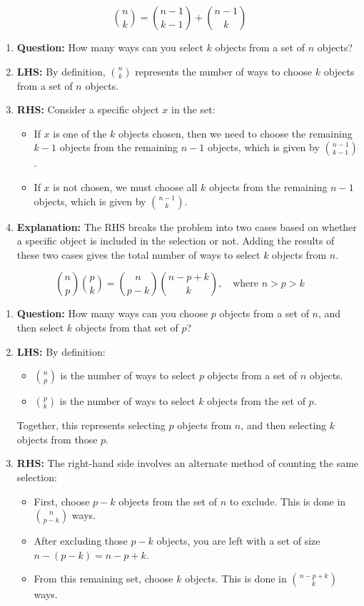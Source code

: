 \begin{example}
    \[
    \binom{n}{k} = \binom{n-1}{k-1} + \binom{n-1}{k}
    \]
    \begin{enumerate}
        \item \textbf{Question:} How many ways can you select $k$ objects from a set of $n$ objects?
        \item \textbf{LHS:} By definition, $\binom{n}{k}$ represents the number of ways to choose $k$ objects from a set of $n$ objects.
        \item \textbf{RHS:} Consider a specific object $x$ in the set:
        \begin{itemize}
            \item If $x$ is one of the $k$ objects chosen, then we need to choose the remaining $k-1$ objects from the remaining $n-1$ objects, which is given by $\binom{n-1}{k-1}$.
            \item If $x$ is not chosen, we must choose all $k$ objects from the remaining $n-1$ objects, which is given by $\binom{n-1}{k}$.
        \end{itemize}
        \item \textbf{Explanation:} The RHS breaks the problem into two cases based on whether a specific object is included in the selection or not. Adding the results of these two cases gives the total number of ways to select $k$ objects from $n$.
    \end{enumerate}

    \[
    \binom{n}{p} \binom{p}{k} = \binom{n}{p-k} \binom{n-p+k}{k}, \quad \text{where } n > p > k
    \]
    \begin{enumerate}
        \item \textbf{Question:} How many ways can you choose $p$ objects from a set of $n$, and then select $k$ objects from that set of $p$?
        \item \textbf{LHS:} By definition:
        \begin{itemize}
            \item $\binom{n}{p}$ is the number of ways to select $p$ objects from a set of $n$ objects.
            \item $\binom{p}{k}$ is the number of ways to select $k$ objects from the set of $p$.
        \end{itemize}
        Together, this represents selecting $p$ objects from $n$, and then selecting $k$ objects from those $p$.
        
        \item \textbf{RHS:} The right-hand side involves an alternate method of counting the same selection:
        \begin{itemize}
            \item First, choose $p-k$ objects from the set of $n$ to exclude. This is done in $\binom{n}{p-k}$ ways.
            \item After excluding those $p-k$ objects, you are left with a set of size $n - (p - k) = n - p + k$.
            \item From this remaining set, choose $k$ objects. This is done in $\binom{n - p + k}{k}$ ways.
        \end{itemize}
        

\end{enumerate}
\end{example}
